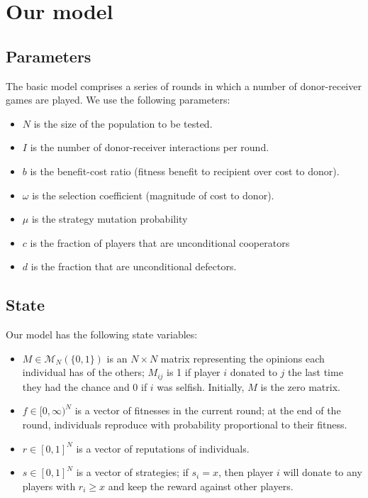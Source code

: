 \documentclass{amsart}
\begin{document}
\section{Our model}
\label{sec:model}

\subsection{Parameters}

The basic model comprises a series of rounds in which a number of donor-receiver games are played. We use the following parameters:

\begin{itemize}
\item $N$ is the size of the population to be tested.
\item $I$ is the number of donor-receiver interactions per round.
\item $b$ is the benefit-cost ratio (fitness benefit to recipient over cost to donor).
\item $\omega$ is the selection coefficient (magnitude of cost to donor).
\item $\mu$ is the strategy mutation probability
\item $c$ is the fraction of players that are unconditional cooperators
\item $d$ is the fraction that are unconditional defectors.
\end{itemize}

\subsection{State}

Our model has the following state variables:

\begin{itemize}
\item $M \in \mathcal{M}_N(\{0,1\})$ is an $N \times N$ matrix representing the opinions each individual has of the others; $M_{ij}$ is 1 if player $i$ donated to $j$ the last time they had the chance and 0 if $i$ was selfish. Initially, $M$ is the zero matrix.
\item $f \in [0, \infty)^N$ is a vector of fitnesses in the current round; at the end of the round, individuals reproduce with probability proportional to their fitness.
\item $r \in [0,1]^N$ is a vector of reputations of individuals.
\item $s \in [0,1]^N$ is a vector of strategies; if $s_i = x$, then player $i$ will donate to any players with $r_i \ge x$ and keep the reward against other players.
\end{itemize}
\end{document}
